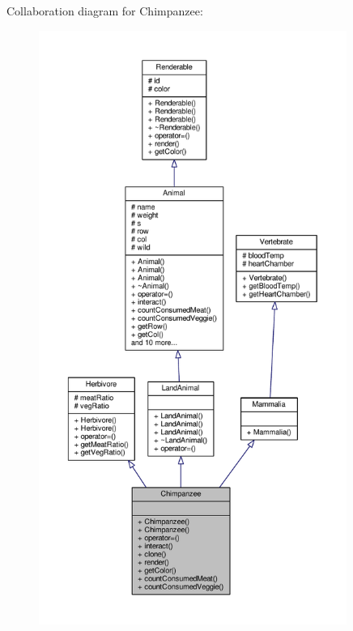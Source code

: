 Collaboration diagram for Chimpanzee\+:
\nopagebreak
\begin{figure}[H]
\begin{center}
\leavevmode
\includegraphics[height=550pt]{classChimpanzee__coll__graph}
\end{center}
\end{figure}
